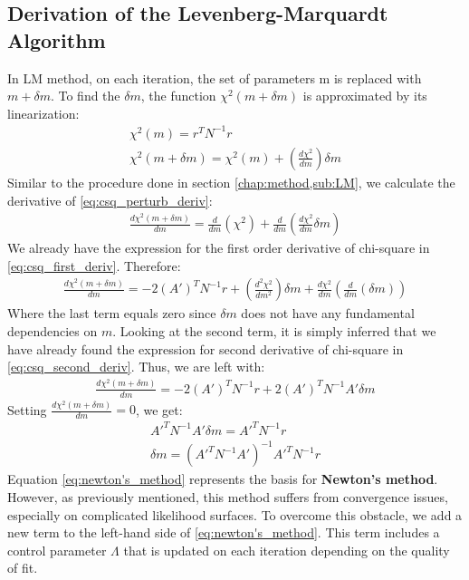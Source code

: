 \documentclass[12pt, TexShade, letterpaper]{report}
\begin{document}
\subsection{Derivation of the Levenberg-Marquardt Algorithm}
In LM method, on each iteration, the set of parameters m is replaced with $m+\delta m$. To find the $\delta m$, the function $\chi^2 (m +\delta m)$ is approximated by its linearization: 
\begin{gather}
    \chi^2 \left(m\right) = r^T N^{-1} r\\
    \chi^2 \left(m + \delta m\right) =  \chi^2 \left(m\right) + \left(\frac{d \chi^2}{dm}\right) \delta m \label{eq:csq_perturb_deriv}
\end{gather}
Similar to the procedure done in section \ref{chap:method,sub:LM}, we calculate the derivative of \ref{eq:csq_perturb_deriv}:
\begin{gather}
    \frac{d \chi^2 \left(m +\delta m\right)}{dm} = \frac{d}{dm} \left(\chi^2\right) + \frac{d}{dm} \left(\frac{d\chi^2}{dm} \delta m\right)
\end{gather}
We already have the expression for the first order derivative of chi-square in \ref{eq:csq_first_deriv}. Therefore:
\begin{gather}
   \frac{d \chi^2 \left(m +\delta m\right)}{dm} =  -2 \left(A'\right)^T N^{-1} r + \left(\frac{d^2 \chi^2}{dm^2}\right) \delta m + \frac{d\chi^2}{dm} \left(\frac{d}{dm} (\delta m)\right)
\end{gather}
Where the last term equals zero since $\delta m$ does not have any fundamental dependencies on $m$. Looking at the second term, it is simply inferred that we have already found the expression for second derivative of chi-square in \ref{eq:csq_second_deriv}. Thus, we are left with:
\begin{gather}
    \frac{d \chi^2 (m +\delta m)}{dm} =  -2 \left(A'\right)^T N^{-1} r + 2 \left(A'\right)^T N^{-1} A'\delta m
\end{gather}
Setting $\frac{d \chi^2 (m +\delta m)}{dm} = 0$, we get:
\begin{gather}
    A'^{T} N^{-1}A' \delta m = A'^T N^{-1} r \\
    \delta m = \left(A'^{T} N^{-1}A'\right)^{-1} A'^T N^{-1} r \label{eq:newton's_method}   
\end{gather}
Equation \ref{eq:newton's_method} represents the basis for \textbf{Newton's method}. However, as previously mentioned, this method suffers from convergence issues, especially on complicated likelihood surfaces. To overcome this obstacle, we add a new term to the left-hand side of \ref{eq:newton's_method}. This term includes a control parameter $\Lambda$ that is updated on each iteration depending on the quality of fit. \par
\end{document}
